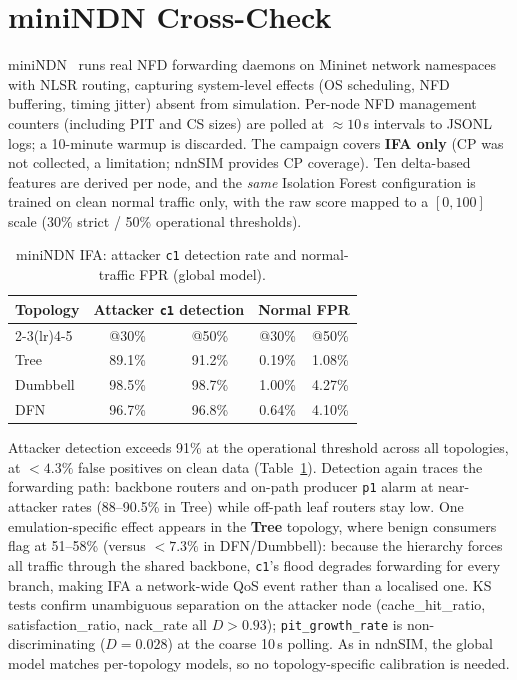 \documentclass[11pt,a4paper]{article}
\begin{document}
\section{miniNDN Cross-Check}

miniNDN~\cite{minindn} runs real NFD forwarding daemons on Mininet network namespaces with NLSR routing, capturing system-level effects (OS scheduling, NFD buffering, timing jitter) absent from simulation. Per-node NFD management counters (including PIT and CS sizes) are polled at $\approx 10$\,s intervals to JSONL logs; a 10-minute warmup is discarded. The campaign covers \textbf{IFA only} (CP was not collected, a limitation; ndnSIM provides CP coverage). Ten delta-based features are derived per node, and the \emph{same} Isolation Forest configuration is trained on clean normal traffic only, with the raw score mapped to a $[0,100]$ scale (30\% strict / 50\% operational thresholds).

\begin{table}[H]
\centering
\caption{miniNDN IFA: attacker \texttt{c1} detection rate and normal-traffic FPR (global model).}
\label{tab:minindn-detection}
\begin{tabular}{lcccc}
\toprule
\multirow{2}{*}{\textbf{Topology}} &
\multicolumn{2}{c}{\textbf{Attacker \texttt{c1} detection}} &
\multicolumn{2}{c}{\textbf{Normal FPR}} \\
\cmidrule(lr){2-3}\cmidrule(lr){4-5}
& @30\% & @50\% & @30\% & @50\% \\
\midrule
Tree     & 89.1\% & 91.2\% & 0.19\% & 1.08\% \\
Dumbbell & 98.5\% & 98.7\% & 1.00\% & 4.27\% \\
DFN      & 96.7\% & 96.8\% & 0.64\% & 4.10\% \\
\bottomrule
\end{tabular}
\end{table}

Attacker detection exceeds 91\% at the operational threshold across all topologies, at $<4.3\%$ false positives on clean data (Table~\ref{tab:minindn-detection}). Detection again traces the forwarding path: backbone routers and on-path producer \texttt{p1} alarm at near-attacker rates (88--90.5\% in Tree) while off-path leaf routers stay low. One emulation-specific effect appears in the \textbf{Tree} topology, where benign consumers flag at 51--58\% (versus $<7.3\%$ in DFN/Dumbbell): because the hierarchy forces all traffic through the shared backbone, \texttt{c1}'s flood degrades forwarding for every branch, making IFA a network-wide QoS event rather than a localised one. KS tests confirm unambiguous separation on the attacker node (cache\_hit\_ratio, satisfaction\_ratio, nack\_rate all $D\!>\!0.93$); \texttt{pit\_growth\_rate} is non-discriminating ($D=0.028$) at the coarse 10\,s polling. As in ndnSIM, the global model matches per-topology models, so no topology-specific calibration is needed.
\end{document}
